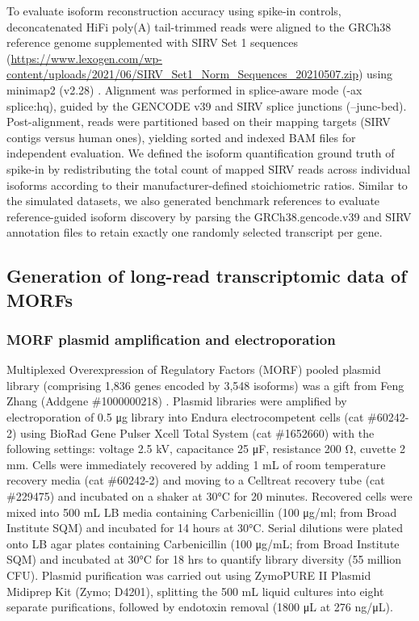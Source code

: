 To evaluate isoform reconstruction accuracy using spike-in controls, deconcatenated HiFi poly(A) tail-trimmed reads were aligned to the GRCh38 reference genome supplemented with SIRV Set 1 sequences (\url{https://www.lexogen.com/wp-content/uploads/2021/06/SIRV_Set1_Norm_Sequences_20210507.zip}) using minimap2 (v2.28) \citep{li2018}. Alignment was performed in splice-aware mode (-ax splice:hq), guided by the GENCODE v39 and SIRV splice junctions (--junc-bed). Post-alignment, reads were partitioned based on their mapping targets (SIRV contigs versus human ones), yielding sorted and indexed BAM files for independent evaluation. We defined the isoform quantification ground truth of spike-in by redistributing the total count of mapped SIRV reads across individual isoforms according to their manufacturer-defined stoichiometric ratios. Similar to the simulated datasets, we also generated benchmark references to evaluate reference-guided isoform discovery by parsing the GRCh38.gencode.v39 and SIRV annotation files to retain exactly one randomly selected transcript per gene.

\subsection{Generation of long-read transcriptomic data of MORFs}\label{generation-of-long-read-transcriptomic-data-of-morfs}

\subsubsection{MORF plasmid amplification and electroporation}\label{morf-plasmid-amplification-and-electroporation}

Multiplexed Overexpression of Regulatory Factors (MORF) pooled plasmid library (comprising 1,836 genes encoded by 3,548 isoforms) was a gift from Feng Zhang (Addgene \#1000000218) \citep{joung2023}. Plasmid libraries were amplified by electroporation of 0.5 μg library into Endura electrocompetent cells (cat \#60242-2) using BioRad Gene Pulser Xcell Total System (cat \#1652660) with the following settings: voltage 2.5 kV, capacitance 25 μF, resistance 200 Ω, cuvette 2 mm. Cells were immediately recovered by adding 1 mL of room temperature recovery media (cat \#60242-2) and moving to a Celltreat recovery tube (cat \#229475) and incubated on a shaker at 30°C for 20 minutes. Recovered cells were mixed into 500 mL LB media containing Carbenicillin (100 μg/ml; from Broad Institute SQM) and incubated for 14 hours at 30°C. Serial dilutions were plated onto LB agar plates containing Carbenicillin (100 μg/mL; from Broad Institute SQM) and incubated at 30°C for 18 hrs to quantify library diversity (55 million CFU). Plasmid purification was carried out using ZymoPURE II Plasmid Midiprep Kit (Zymo; D4201), splitting the 500 mL liquid cultures into eight separate purifications, followed by endotoxin removal (1800 μL at 276 ng/μL).

